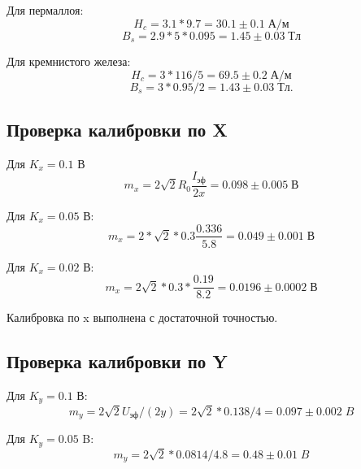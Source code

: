 \documentclass[a4paper]{article}
\begin{document}
Для пермаллоя:
\begin{equation*}\label{key}
	H_c = 3.1 * 9.7 = 30.1 \pm 0.1 \; А / м
\end{equation*}
\begin{equation*}\label{key}
	B_s = 2.9 * 5 * 0.095 = 1.45 \pm 0.03 \; Тл
\end{equation*}

Для кремнистого железа:
\begin{equation*}\label{key}
	H_c = 3 * 116 / 5 = 69.5 \pm 0.2 \; А / м
\end{equation*}
\begin{equation*}\label{key}
	B_s = 3 * 0.95 / 2 = 1.43 \pm 0.03 \; Тл.
\end{equation*}

\subsection{Проверка калибровки по X}

Для $ K_x = 0.1 $ В
\begin{equation*}\label{key}
	m_x = 2 \sqrt{2} R_0 \frac{I_{эф}}{2 x} = 0.098\pm 0.005\; В
\end{equation*}

Для $ K_x = 0.05  $ В:
\begin{equation}\label{key}
	m_x = 2 * \sqrt{2} * 0.3 \frac{0.336}{5.8} = 0.049\pm 0.001\; В
\end{equation}

Для $ K_x = 0.02 $ В:
\begin{equation}\label{key}
	m_x = 2\sqrt{2} * 0.3 * \frac{0.19}{8.2} = 0.0196\pm 0.0002 \; В
\end{equation}

Калибровка по x выполнена с достаточной точностью.

\subsection{Проверка калибровки по Y}

Для $ K_y = 0.1 $ В:
\begin{equation*}\label{key}
	m_y = 2\sqrt{2} U_{эф} / (2y) = 2 \sqrt{2} * 0.138 / 4 = 0.097\pm 0.002 \;B
\end{equation*}

Для $ K_y = 0.05 $ B:
\begin{equation*}\label{key}
	m_y = 2 \sqrt{2} * 0.0814 / 4.8 = 0.48\pm 0.01 \; B
\end{equation*}
\end{document}
